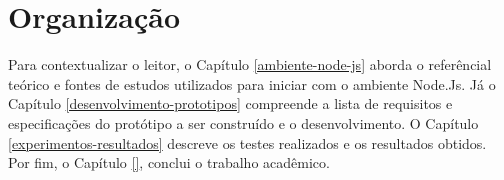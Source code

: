   
\section{Organização}
\label{organizacao}  

  Para contextualizar o leitor, o Capítulo \ref{ambiente-node-js} aborda o referêncial teórico e fontes de estudos utilizados para iniciar com o ambiente 
  Node.Js. Já o Capítulo \ref{desenvolvimento-prototipos} compreende a lista de requisitos e especificações do protótipo a ser construído e o
  desenvolvimento. O Capítulo \ref{experimentos-resultados} descreve os testes realizados e os resultados obtidos. 
  Por fim, o Capítulo \ref{}, conclui o trabalho acadêmico.